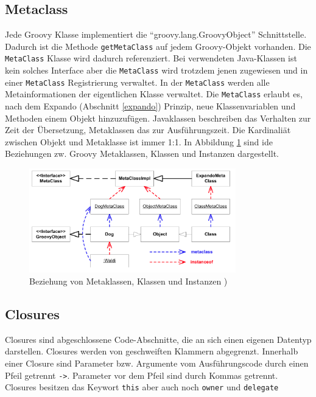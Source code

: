 \documentclass[11pt,english,ngerman, headsepline]{scrreprt}
\begin{document}
 \subsection{Metaclass}\label{Metaclass}
 
Jede Groovy Klasse implementiert die ``groovy.lang.GroovyObject''
 Schnittstelle.
Dadurch ist die Methode \texttt{getMetaClass} auf jedem Groovy-Objekt
vorhanden.
Die \texttt{MetaClass} Klasse wird dadurch referenziert.
Bei verwendeten Java-Klassen ist kein solches Interface aber die
\texttt{MetaClass} wird trotzdem jenen zugewiesen und in einer
\texttt{MetaClass} Registrierung \cite{fowler2003patterns}
verwaltet.
In der \texttt{MetaClass} werden alle Metainformationen der eigentlichen Klasse
verwaltet. Die \texttt{MetaClass} erlaubt es, nach dem Expando (Abschnitt
\ref{expando}) Prinzip, neue Klassenvariablen und Methoden einem Objekt
hinzuzufügen.
Javaklassen beschreiben das Verhalten zur Zeit der Übersetzung, Metaklassen
das zur Ausführungszeit.
Die Kardinaliät zwischen Objekt und Metaklasse ist immer 1:1.
In Abbildung \ref{groovyMetaclassDiagram} sind ide Beziehungen zw. Groovy
Metaklassen, Klassen und Instanzen dargestellt. 

\begin{figure}[h!]
	\begin{center}
	\includegraphics[width=0.8\textwidth]{pics/groovyMetaklassen}
	\end{center}
	\caption{Beziehung von Metaklassen, Klassen und Instanzen \cite{mpInGroovy})}
	\label{groovyMetaclassDiagram}
\end{figure}

\subsection{Closures}

Closures sind abgeschlossene Code-Abschnitte, die an sich einen eigenen
Datentyp darstellen. Closures werden von geschweiften Klammern abgegrenzt.
Innerhalb einer Closure sind Parameter bzw. Argumente vom Ausführungscode durch
einen Pfeil getrennt \texttt{->}. Parameter vor dem Pfeil sind durch Kommas
getrennt.
Closures besitzen das Keywort \texttt{this} aber auch noch \texttt{owner} und
\texttt{delegate}
\end{document}
